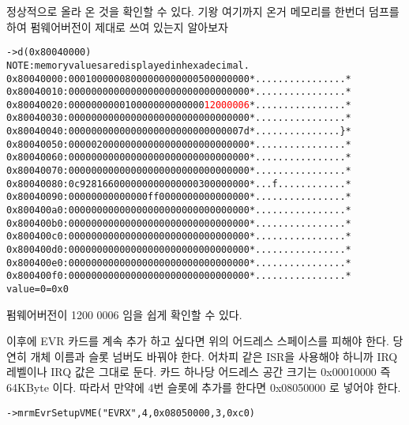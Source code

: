 \documentclass[11pt,a4paper]{article}
\begin{document}
정상적으로 올라 온 것을 확인할 수 있다. 기왕 여기까지 온거 메모리를 한번더 덤프를 하여 펌웨어버전이 제대로 쓰여 있는지 알아보자

\begin{framed}
\begin{alltt}
-> d(0x80040000)                             
NOTE: memory values are displayed in hexadecimal.
0x80040000:  0001 0000 0080 0000 0000 0005 0000 0000  *................*
0x80040010:  0000 0000 0000 0000 0000 0000 0000 0000  *................*
0x80040020:  0000 0000 0010 0000 0000 0000 \textcolor{red}{1200 0006}  *................*
0x80040030:  0000 0000 0000 0000 0000 0000 0000 0000  *................*
0x80040040:  0000 0000 0000 0000 0000 0000 0000 007d  *...............\}*
0x80040050:  0000 0200 0000 0000 0000 0000 0000 0000  *................*
0x80040060:  0000 0000 0000 0000 0000 0000 0000 0000  *................*
0x80040070:  0000 0000 0000 0000 0000 0000 0000 0000  *................*
0x80040080:  0c92 8166 0000 0000 0000 0003 0000 0000  *...f............*
0x80040090:  0000 0000 0000 00ff 0000 0000 0000 0000  *................*
0x800400a0:  0000 0000 0000 0000 0000 0000 0000 0000  *................*
0x800400b0:  0000 0000 0000 0000 0000 0000 0000 0000  *................*
0x800400c0:  0000 0000 0000 0000 0000 0000 0000 0000  *................*
0x800400d0:  0000 0000 0000 0000 0000 0000 0000 0000  *................*
0x800400e0:  0000 0000 0000 0000 0000 0000 0000 0000  *................*
0x800400f0:  0000 0000 0000 0000 0000 0000 0000 0000  *................*
value = 0 = 0x0
\end{alltt}
\end{framed}

펌웨어버전이 1200 0006 임을 쉽게 확인할 수 있다.


이후에 EVR 카드를 계속 추가 하고 싶다면 위의 어드레스 스페이스를 피해야 한다.
당연히 개체 이름과 슬롯 넘버도 바꿔야 한다. 어차피 같은 ISR을 사용해야 하니까 IRQ 레벨이나 
IRQ 값은 그대로 둔다. 카드 하나당 어드레스 공간 크기는 0x00010000 즉 64KByte 이다.
따라서 만약에 4번 슬롯에 추가를 한다면 0x08050000 로 넣어야 한다.
\begin{framed}
\begin{alltt}
-> mrmEvrSetupVME("EVRX",4,0x08050000,3,0xc0)
\end{alltt}
\end{framed}




\end{document}
